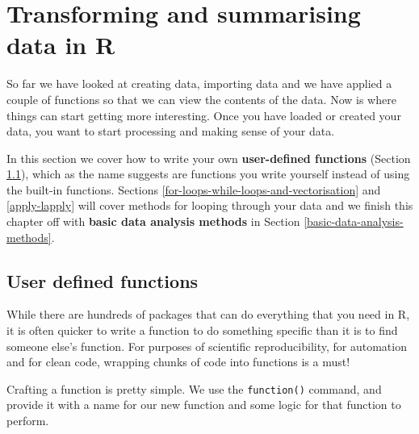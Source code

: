 \documentclass[a4paper]{book}
\begin{document}
\chapter{Transforming and summarising data in
R}\label{transforming-and-summarising-data-in-r}

So far we have looked at creating data, importing data and we have
applied a couple of functions so that we can view the contents of the
data. Now is where things can start getting more interesting. Once you
have loaded or created your data, you want to start processing and
making sense of your data.

In this section we cover how to write your own \textbf{user-defined
functions} (Section \ref{user-defined-functions}), which as the name
suggests are functions you write yourself instead of using the built-in
functions. Sections \ref{for-loops-while-loops-and-vectorisation} and
\ref{apply-lapply} will cover methods for looping through your data and
we finish this chapter off with \textbf{basic data analysis methods} in
Section \ref{basic-data-analysis-methods}.

\section{User defined functions}\label{user-defined-functions}

While there are hundreds of packages that can do everything that you
need in R, it is often quicker to write a function to do something
specific than it is to find someone else's function. For purposes of
scientific reproducibility, for automation and for clean code, wrapping
chunks of code into functions is a must!

Crafting a function is pretty simple. We use the \texttt{function()}
command, and provide it with a name for our new function and some logic
for that function to perform.
\end{document}

